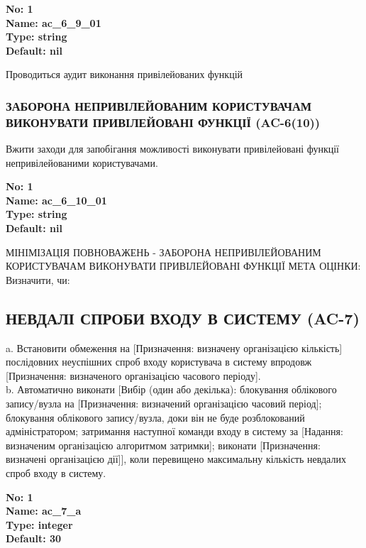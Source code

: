 \documentclass{article}
\begin{document}
\vspace{10pt}
{\footnotesize\bfseries
No: 1\\
Name: ac\_\allowbreak{}6\_\allowbreak{}9\_\allowbreak{}01\\
Type: string\\
Default: nil
}

{\footnotesize Проводиться аудит виконання привілейованих функцій}




\subsubsection{ЗАБОРОНА НЕПРИВІЛЕЙОВАНИМ КОРИСТУВАЧАМ ВИКОНУВАТИ ПРИВІЛЕЙОВАНІ ФУНКЦІЇ (AC-6(10))}
Вжити заходи для запобігання можливості виконувати привілейовані функції непривілейованими користувачами.

\vspace{10pt}
{\footnotesize\bfseries
No: 1\\
Name: ac\_\allowbreak{}6\_\allowbreak{}10\_\allowbreak{}01\\
Type: string\\
Default: nil
}

{\footnotesize МІНІМІЗАЦІЯ ПОВНОВАЖЕНЬ - ЗАБОРОНА НЕПРИВІЛЕЙОВАНИМ КОРИСТУВАЧАМ ВИКОНУВАТИ ПРИВІЛЕЙОВАНІ ФУНКЦІЇ МЕТА ОЦІНКИ: Визначити, чи:}




\subsection{НЕВДАЛІ СПРОБИ ВХОДУ В СИСТЕМУ (AC-7)}
a. Встановити обмеження на [Призначення: визначену організацією кількість] послідовних неуспішних спроб входу користувача в систему впродовж [Призначення: визначеного організацією часового періоду].\\ 
b. Автоматично виконати [Вибір (один або декілька): блокування облікового запису/вузла на [Призначення: визначений організацією часовий період]; блокування облікового запису/вузла, доки він не буде розблокований адміністратором; затримання наступної команди входу в систему за [Надання: визначеним організацією алгоритмом затримки]; виконати [Призначення: визначені організацією дії]], коли перевищено максимальну кількість невдалих спроб входу в систему.

\vspace{10pt}
{\footnotesize\bfseries
No: 1\\
Name: ac\_\allowbreak{}7\_\allowbreak{}a\\
Type: integer\\
Default: 30
}
\end{document}
